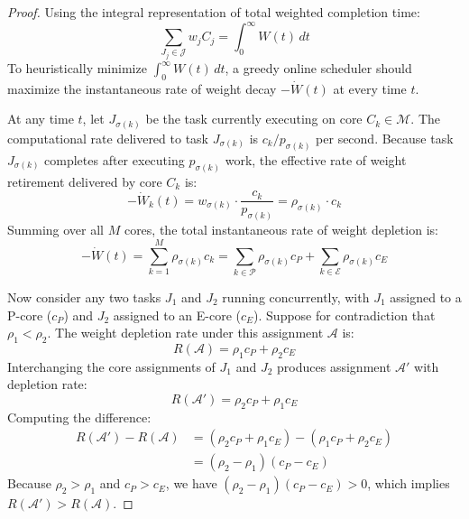 \documentclass[conference]{IEEEtran}
\begin{document}
\begin{proof}
Using the integral representation of total weighted completion time:
\begin{equation}
\sum_{J_j \in \mathcal{J}} w_j C_j = \int_0^\infty W(t) \, dt
\end{equation}
To heuristically minimize $\int_0^\infty W(t) \, dt$, a greedy online scheduler should maximize the instantaneous rate of weight decay $-\dot{W}(t)$ at every time $t$.

At any time $t$, let $J_{\sigma(k)}$ be the task currently executing on core $C_k \in \mathcal{M}$. The computational rate delivered to task $J_{\sigma(k)}$ is $c_k / p_{\sigma(k)}$ per second. Because task $J_{\sigma(k)}$ completes after executing $p_{\sigma(k)}$ work, the effective rate of weight retirement delivered by core $C_k$ is:
\begin{equation}
-\dot{W}_k(t) = w_{\sigma(k)} \cdot \frac{c_k}{p_{\sigma(k)}} = \rho_{\sigma(k)} \cdot c_k
\end{equation}
Summing over all $M$ cores, the total instantaneous rate of weight depletion is:
\begin{equation}
\label{eq:weight_depletion_inner_prod}
-\dot{W}(t) = \sum_{k=1}^M \rho_{\sigma(k)} c_k = \sum_{k \in \mathcal{P}} \rho_{\sigma(k)} c_P + \sum_{k \in \mathcal{E}} \rho_{\sigma(k)} c_E
\end{equation}

Now consider any two tasks $J_1$ and $J_2$ running concurrently, with $J_1$ assigned to a P-core ($c_P$) and $J_2$ assigned to an E-core ($c_E$). Suppose for contradiction that $\rho_1 < \rho_2$.
The weight depletion rate under this assignment $\mathcal{A}$ is:
\begin{equation}
R(\mathcal{A}) = \rho_1 c_P + \rho_2 c_E
\end{equation}
Interchanging the core assignments of $J_1$ and $J_2$ produces assignment $\mathcal{A}'$ with depletion rate:
\begin{equation}
R(\mathcal{A}') = \rho_2 c_P + \rho_1 c_E
\end{equation}
Computing the difference:
\begin{align}
R(\mathcal{A}') - R(\mathcal{A}) &= (\rho_2 c_P + \rho_1 c_E) - (\rho_1 c_P + \rho_2 c_E) \nonumber \\
&= (\rho_2 - \rho_1)(c_P - c_E)
\end{align}
Because $\rho_2 > \rho_1$ and $c_P > c_E$, we have $(\rho_2 - \rho_1)(c_P - c_E) > 0$, which implies $R(\mathcal{A}') > R(\mathcal{A})$.


\end{proof}
\end{document}
